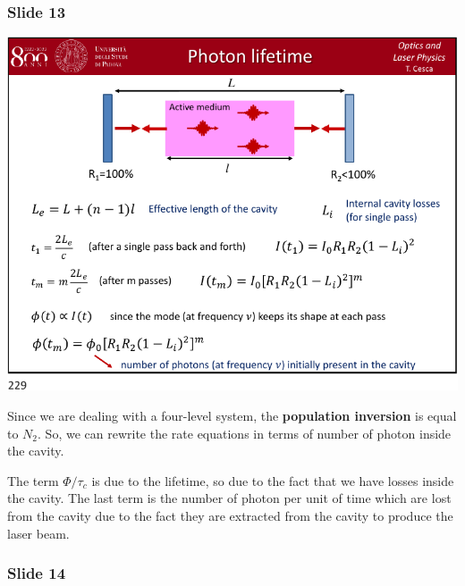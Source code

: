 \documentclass[../main/main.tex]{subfiles}
\begin{document}
\subsubsection*{Slide 13}

\begin{minipage}[]{0.5\linewidth}
\centering
\includegraphics[page=13,width=1\textwidth]{../lessons/pdf_file/12_lecture.pdf}
\end{minipage}
\hspace{0.3cm}\vspace{0.3cm}
\begin{minipage}[c]{0.47\linewidth}

Since we are dealing with a four-level system, the \textbf{population inversion} is equal to \( N_2 \). So, we can rewrite the rate equations in terms of number of photon inside the cavity.

The term \( \Phi / \tau_c \) is due to the lifetime, so due to the fact that we have losses inside the cavity. The last term is the number of photon per unit of time which are lost from the cavity due to the fact they are extracted from the cavity to produce the laser beam.

\end{minipage}

\subsubsection*{Slide 14}
\end{document}
